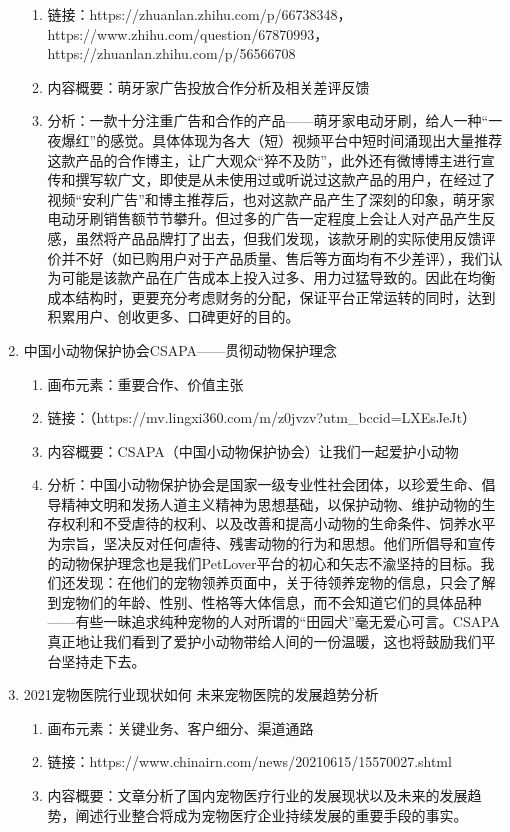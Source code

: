 \documentclass[a4paper]{ctexart}
\begin{document}
\begin{enumerate}[label=\alph*.]
\begin{enumerate}[label=\alph*.]
    \item 链接：https://zhuanlan.zhihu.com/p/66738348，https://www.zhihu.com/question/67870993，https://zhuanlan.zhihu.com/p/56566708
    \item 内容概要：萌牙家广告投放合作分析及相关差评反馈
    \item 分析：一款十分注重广告和合作的产品——萌牙家电动牙刷，给人一种“一夜爆红”的感觉。具体体现为各大（短）视频平台中短时间涌现出大量推荐这款产品的合作博主，让广大观众“猝不及防”，此外还有微博博主进行宣传和撰写软广文，即使是从未使用过或听说过这款产品的用户，在经过了视频“安利广告”和博主推荐后，也对这款产品产生了深刻的印象，萌牙家电动牙刷销售额节节攀升。但过多的广告一定程度上会让人对产品产生反感，虽然将产品品牌打了出去，但我们发现，该款牙刷的实际使用反馈评价并不好（如已购用户对于产品质量、售后等方面均有不少差评），我们认为可能是该款产品在广告成本上投入过多、用力过猛导致的。因此在均衡成本结构时，更要充分考虑财务的分配，保证平台正常运转的同时，达到积累用户、创收更多、口碑更好的目的。
  \end{enumerate}
  \item 中国小动物保护协会CSAPA——贯彻动物保护理念
  \begin{enumerate}[label=\alph*.]
    \item 画布元素：重要合作、价值主张
    \item 链接：（https://mv.lingxi360.com/m/z0jvzv?utm\_bccid=LXEsJeJt）
    \item 内容概要：CSAPA（中国小动物保护协会）让我们一起爱护小动物
    \item 分析：中国小动物保护协会是国家一级专业性社会团体，以珍爱生命、倡导精神文明和发扬人道主义精神为思想基础，以保护动物、维护动物的生存权利和不受虐待的权利、以及改善和提高小动物的生命条件、饲养水平为宗旨，坚决反对任何虐待、残害动物的行为和思想。他们所倡导和宣传的动物保护理念也是我们PetLover平台的初心和矢志不渝坚持的目标。我们还发现：在他们的宠物领养页面中，关于待领养宠物的信息，只会了解到宠物们的年龄、性别、性格等大体信息，而不会知道它们的具体品种——有些一昧追求纯种宠物的人对所谓的“田园犬”毫无爱心可言。CSAPA真正地让我们看到了爱护小动物带给人间的一份温暖，这也将鼓励我们平台坚持走下去。
  \end{enumerate}
  \item 2021宠物医院行业现状如何 未来宠物医院的发展趋势分析
  \begin{enumerate}[label=\alph*.]
    \item 画布元素：关键业务、客户细分、渠道通路
    \item 链接：https://www.chinairn.com/news/20210615/15570027.shtml
    \item 内容概要：文章分析了国内宠物医疗行业的发展现状以及未来的发展趋势，阐述行业整合将成为宠物医疗企业持续发展的重要手段的事实。

\end{enumerate}
\end{enumerate}
\end{document}
